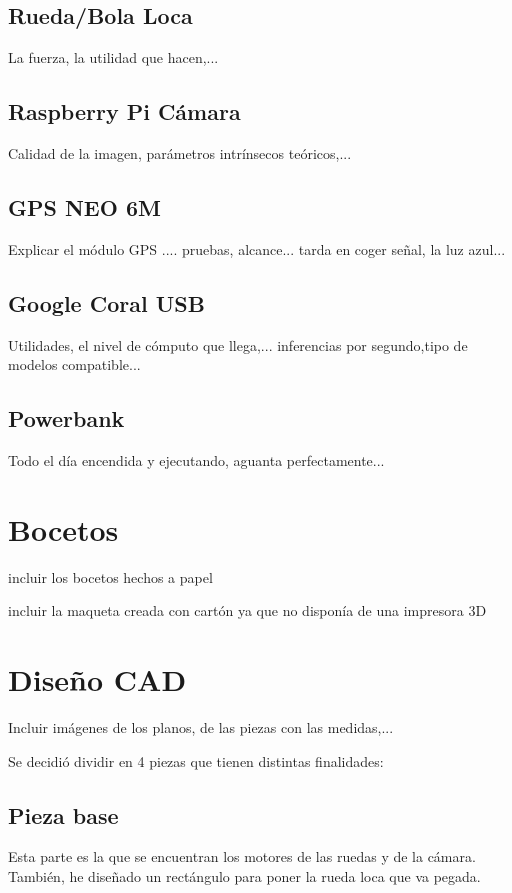 \subsection{Rueda/Bola Loca}
La fuerza, la utilidad que hacen,...

\subsection{Raspberry Pi Cámara}

Calidad de la imagen, parámetros intrínsecos teóricos,... 

\subsection{GPS NEO 6M}
Explicar el módulo GPS .... pruebas, alcance... tarda en coger señal, la luz azul...

\subsection{Google Coral USB}

Utilidades, el nivel de cómputo que llega,... inferencias por segundo,tipo de modelos compatible...

\subsection{Powerbank}
 
 Todo el día encendida y ejecutando, aguanta perfectamente... 
 
  
\section{Bocetos}

incluir los bocetos hechos a papel

incluir la maqueta creada con cartón ya que no disponía de una impresora 3D

\section{Diseño CAD}

Incluir imágenes de los planos, de las piezas con las medidas,...

Se decidió dividir en 4 piezas que tienen distintas finalidades:

\subsection{Pieza base}
Esta parte es la que se encuentran los motores de las ruedas y de la cámara. También, he diseñado un rectángulo para poner la rueda loca que va pegada.

